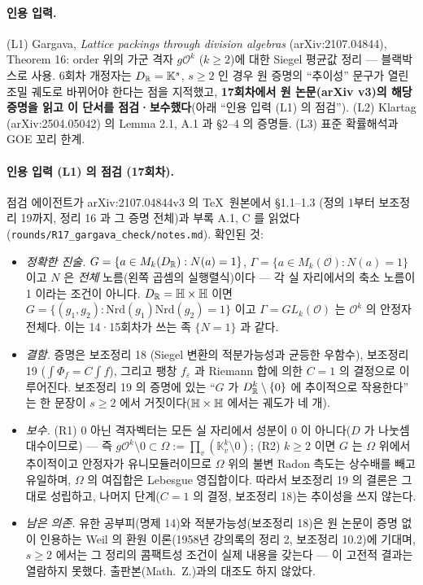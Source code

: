 \paragraph{인용 입력.} (L1) Gargava, \emph{Lattice packings through division algebras} (arXiv:2107.04844), Theorem 16: order 위의 가군 격자 $g\mathcal O^k$ ($k\ge2$)에 대한 Siegel 평균값 정리 --- 블랙박스로 사용. 6회차 개정자는 $D_{\mathbb{R}}=\mathbb K^s$, $s\ge2$ 인 경우 원 증명의 ``추이성'' 문구가 열린 조밀 궤도로 바뀌어야 한다는 점을 지적했고, \textbf{17회차에서 원 논문(arXiv v3)의 해당 증명을 읽고 이 단서를 점검·보수했다}(아래 ``인용 입력 (L1) 의 점검''). (L2) Klartag (arXiv:2504.05042) 의 Lemma 2.1, A.1 과 \S2--4 의 증명들. (L3) 표준 확률해석과 GOE 꼬리 한계.

\paragraph{인용 입력 (L1) 의 점검 (17회차).} 점검 에이전트가 arXiv:2107.04844v3 의 \TeX\ 원본에서 \S1.1--1.3 (정의 1부터 보조정리 19까지, 정리 16 과 그 증명 전체)과 부록 A.1, C 를 읽었다(\texttt{rounds/R17\_gargava\_check/notes.md}). 확인된 것:
\begin{itemize}
\item \emph{정확한 진술.} $G=\{a\in M_k(D_{\mathbb{R}}):N(a)=1\}$, $\Gamma=\{a\in M_k(\mathcal O):N(a)=1\}$ 이고 $N$ 은 \emph{전체} 노름(왼쪽 곱셈의 실행렬식)이다 --- 각 실 자리에서의 축소 노름이 1 이라는 조건이 아니다. $D_{\mathbb{R}}=\mathbb{H}\times\mathbb{H}$ 이면 $G=\{(g_1,g_2):\mathrm{Nrd}(g_1)\mathrm{Nrd}(g_2)=1\}$ 이고 $\Gamma=GL_k(\mathcal O)$ 는 $\mathcal O^k$ 의 안정자 전체다. 이는 14·15회차가 쓰는 족 $\{N=1\}$ 과 같다.
\item \emph{결함.} 증명은 보조정리 18 (Siegel 변환의 적분가능성과 균등한 우함수), 보조정리 19 ($\int\Phi_f=C\int f$), 그리고 팽창 $f_\varepsilon$ 과 Riemann 합에 의한 $C=1$ 의 결정으로 이루어진다. 보조정리 19 의 증명에 있는 ``$G$ 가 $D_{\mathbb{R}}^k\setminus\{0\}$ 에 추이적으로 작용한다'' 는 한 문장이 $s\ge2$ 에서 거짓이다($\mathbb{H}\times\mathbb{H}$ 에서는 궤도가 네 개).
\item \emph{보수.} (R1) 0 아닌 격자벡터는 모든 실 자리에서 성분이 0 이 아니다($D$ 가 나눗셈대수이므로) --- 즉 $g\mathcal O^k\setminus0\subset\Omega:=\prod_v(\mathbb K_v^k\setminus0)$; (R2) $k\ge2$ 이면 $G$ 는 $\Omega$ 위에서 추이적이고 안정자가 유니모듈러이므로 $\Omega$ 위의 불변 Radon 측도는 상수배를 빼고 유일하며, $\Omega$ 의 여집합은 Lebesgue 영집합이다. 따라서 보조정리 19 의 결론은 그대로 성립하고, 나머지 단계($C=1$ 의 결정, 보조정리 18)는 추이성을 쓰지 않는다.
\item \emph{남은 의존.} 유한 공부피(명제 14)와 적분가능성(보조정리 18)은 원 논문이 증명 없이 인용하는 Weil 의 환원 이론(1958년 강의록의 정리 2, 보조정리 10.2)에 기대며, $s\ge2$ 에서는 그 정리의 콤팩트성 조건이 실제 내용을 갖는다 --- 이 고전적 결과는 열람하지 못했다. 출판본(Math.\ Z.)과의 대조도 하지 않았다.
\end{itemize}
